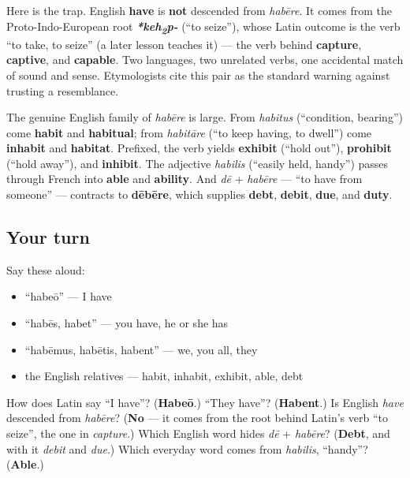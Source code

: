 \begin{cousinweb}
Here is the trap. English \textbf{have} is \textbf{not} descended from \emph{habēre}. It comes from the Proto-Indo-European root \emph{\textbf{*keh\textsubscript{2}p-}} (\textquotedblleft{}to seize\textquotedblright{}), whose Latin outcome is the verb \textquotedblleft{}to take, to seize\textquotedblright{} (a later lesson teaches it) — the verb behind \textbf{capture}, \textbf{captive}, and \textbf{capable}. Two languages, two unrelated verbs, one accidental match of sound and sense. Etymologists cite this pair as the standard warning against trusting a resemblance.

The genuine English family of \emph{habēre} is large. From \emph{habitus} (\textquotedblleft{}condition, bearing\textquotedblright{}) come \textbf{habit} and \textbf{habitual}; from \emph{habitāre} (\textquotedblleft{}to keep having, to dwell\textquotedblright{}) come \textbf{inhabit} and \textbf{habitat}. Prefixed, the verb yields \textbf{exhibit} (\textquotedblleft{}hold out\textquotedblright{}), \textbf{prohibit} (\textquotedblleft{}hold away\textquotedblright{}), and \textbf{inhibit}. The adjective \emph{habilis} (\textquotedblleft{}easily held, handy\textquotedblright{}) passes through French into \textbf{able} and \textbf{ability}. And \emph{dē} + \emph{habēre} — \textquotedblleft{}to have from someone\textquotedblright{} — contracts to \textbf{dēbēre}, which supplies \textbf{debt}, \textbf{debit}, \textbf{due}, and \textbf{duty}.
\end{cousinweb}

\subsection*{Your turn}
Say these aloud:

\begin{itemize}
\raggedright
  \item \textquotedblleft{}habeō\textquotedblright{} — I have
  \item \textquotedblleft{}habēs, habet\textquotedblright{} — you have, he or she has
  \item \textquotedblleft{}habēmus, habētis, habent\textquotedblright{} — we, you all, they
  \item the English relatives — habit, inhabit, exhibit, able, debt
\end{itemize}

\begin{tcolorbox}[breakable,colback=teal!4,colframe=teal!35!black,title={Before you move on}]
How does Latin say \textquotedblleft{}I have\textquotedblright{}? (\textbf{Habeō}.) \textquotedblleft{}They have\textquotedblright{}? (\textbf{Habent}.) Is English \emph{have} descended from \emph{habēre}? (\textbf{No} — it comes from the root behind Latin's verb \textquotedblleft{}to seize\textquotedblright{}, the one in \emph{capture}.) Which English word hides \emph{dē} + \emph{habēre}? (\textbf{Debt}, and with it \emph{debit} and \emph{due}.) Which everyday word comes from \emph{habilis}, \textquotedblleft{}handy\textquotedblright{}? (\textbf{Able}.)
\end{tcolorbox}
